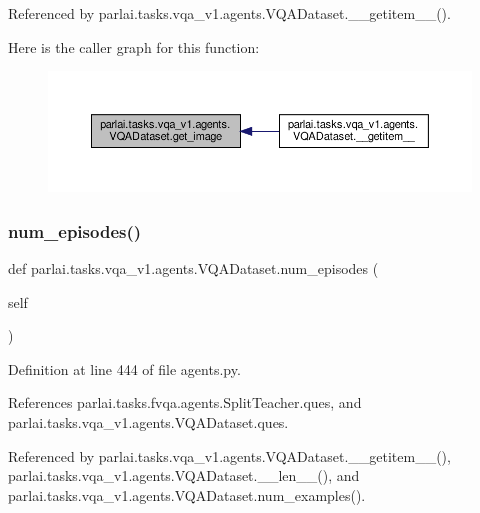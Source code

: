 Referenced by parlai.\+tasks.\+vqa\+\_\+v1.\+agents.\+V\+Q\+A\+Dataset.\+\_\+\+\_\+getitem\+\_\+\+\_\+().

Here is the caller graph for this function\+:
\nopagebreak
\begin{figure}[H]
\begin{center}
\leavevmode
\includegraphics[width=350pt]{classparlai_1_1tasks_1_1vqa__v1_1_1agents_1_1VQADataset_a416fc9e62c61ffa6b56b9e63b5d56132_icgraph}
\end{center}
\end{figure}
\mbox{\label{classparlai_1_1tasks_1_1vqa__v1_1_1agents_1_1VQADataset_a13cd291a46199ed9f505e5948ef25278}} 
\subsubsection{\texorpdfstring{num\+\_\+episodes()}{num\_episodes()}}
{\footnotesize\ttfamily def parlai.\+tasks.\+vqa\+\_\+v1.\+agents.\+V\+Q\+A\+Dataset.\+num\+\_\+episodes (\begin{DoxyParamCaption}\item[{}]{self }\end{DoxyParamCaption})}



Definition at line 444 of file agents.\+py.



References parlai.\+tasks.\+fvqa.\+agents.\+Split\+Teacher.\+ques, and parlai.\+tasks.\+vqa\+\_\+v1.\+agents.\+V\+Q\+A\+Dataset.\+ques.



Referenced by parlai.\+tasks.\+vqa\+\_\+v1.\+agents.\+V\+Q\+A\+Dataset.\+\_\+\+\_\+getitem\+\_\+\+\_\+(), parlai.\+tasks.\+vqa\+\_\+v1.\+agents.\+V\+Q\+A\+Dataset.\+\_\+\+\_\+len\+\_\+\+\_\+(), and parlai.\+tasks.\+vqa\+\_\+v1.\+agents.\+V\+Q\+A\+Dataset.\+num\+\_\+examples().


